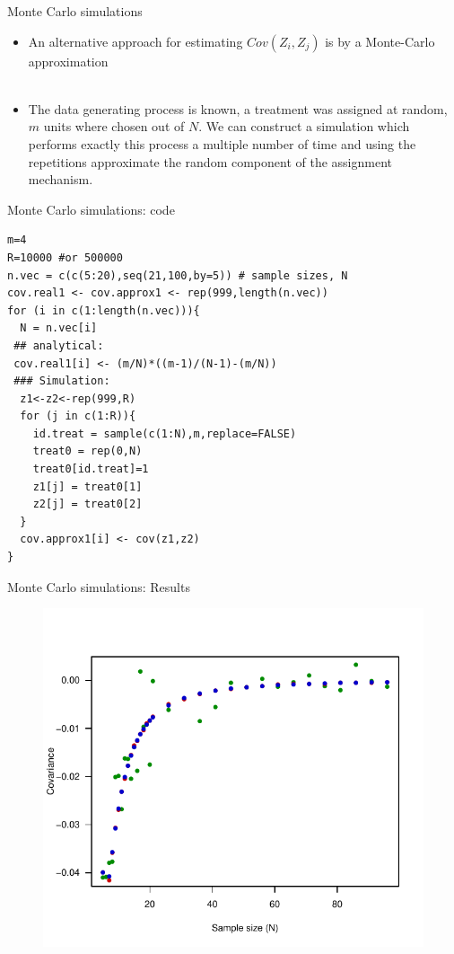 \documentclass[handout]{beamer}
\theoremstyle{definition}
\begin{document}
\begin{frame}{Monte Carlo simulations}
\begin{itemize}
\item An alternative approach for estimating $Cov(Z_i,Z_j)$ is by a Monte-Carlo approximation \pause \\~\\
\item The data generating process is known, a treatment was assigned at random, $m$ units where chosen out of $N$. We can construct a simulation which performs exactly this process a multiple number of time and using the repetitions approximate the random component of the assignment mechanism.   
\end{itemize}
\end{frame}

\begin{frame}[fragile]{Monte Carlo simulations: code}
\small
\begin{verbatim}
m=4
R=10000 #or 500000
n.vec = c(c(5:20),seq(21,100,by=5)) # sample sizes, N
cov.real1 <- cov.approx1 <- rep(999,length(n.vec))
for (i in c(1:length(n.vec))){  
  N = n.vec[i]  
 ## analytical: 
 cov.real1[i] <- (m/N)*((m-1)/(N-1)-(m/N))
 ### Simulation:
  z1<-z2<-rep(999,R)
  for (j in c(1:R)){
    id.treat = sample(c(1:N),m,replace=FALSE)
    treat0 = rep(0,N)
    treat0[id.treat]=1
    z1[j] = treat0[1]
    z2[j] = treat0[2]
  } 
  cov.approx1[i] <- cov(z1,z2)
}
\end{verbatim}
\normalsize
\end{frame}

\begin{frame}{Monte Carlo simulations: Results}
\begin{figure}
\includegraphics[scale=0.8]{figure_cov.pdf}
\end{figure}
\end{frame}
\end{document}
